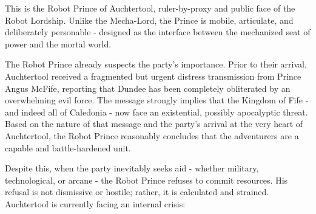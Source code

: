 {\noindent\entryfont This is the Robot Prince of Auchtertool, ruler-by-proxy and public face of the Robot Lordship. Unlike the Mecha-Lord, the Prince is mobile, articulate, and deliberately personable - designed as the interface between the mechanized seat of power and the mortal world.

The Robot Prince already suspects the party's importance. Prior to their arrival, Auchtertool received a fragmented but urgent distress transmission from Prince Angus McFife, reporting that Dundee has been completely obliterated by an overwhelming evil force. The message strongly implies that the Kingdom of Fife - and indeed all of Caledonia - now face an existential, possibly apocalyptic threat. Based on the nature of that message and the party's arrival at the very heart of Auchtertool, the Robot Prince reasonably concludes that the adventurers are a capable and battle-hardened unit.

Despite this, when the party inevitably seeks aid - whether military, technological, or arcane - the Robot Prince refuses to commit resources. His refusal is not dismissive or hostile; rather, it is calculated and strained. Auchtertool is currently facing an internal crisis:}

